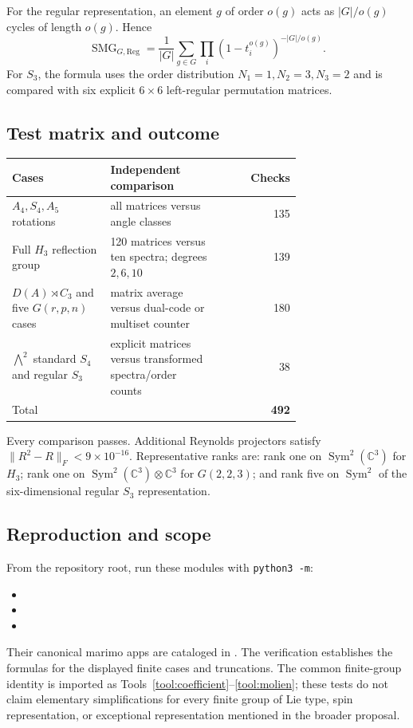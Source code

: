 \documentclass[10pt]{article}
\newcommand{\Sym}{\operatorname{Sym}}
\newcommand{\SMG}{\operatorname{SMG}}
\newcommand{\MGF}{\SMG}
\begin{document}
For the regular representation, an element $g$ of order $o(g)$ acts as
$|G|/o(g)$ cycles of length $o(g)$.  Hence
\[
 \boxed{\MGF_{G,\mathrm{Reg}}
 =\frac1{|G|}\sum_{g\in G}\prod_i
 (1-t_i^{o(g)})^{-|G|/o(g)}.}
\]
For $S_3$, the formula uses the order distribution
$N_1=1,N_2=3,N_3=2$ and is compared with six explicit $6\times6$ left-regular
permutation matrices.

\subsection{Test matrix and outcome}
\begin{center}
\begin{tabular}{@{}p{0.34\linewidth}p{0.38\linewidth}r@{}}
\toprule
Cases & Independent comparison & Checks\\
\midrule
$A_4,S_4,A_5$ rotations & all matrices versus angle classes & 135\\
Full $H_3$ reflection group & 120 matrices versus ten spectra; degrees $2,6,10$ & 139\\
$D(A)\rtimes C_3$ and five $G(r,p,n)$ cases & matrix average versus dual-code or multiset counter & 180\\
$\bigwedge^2$ standard $S_4$ and regular $S_3$ & explicit matrices versus transformed spectra/order counts & 38\\
\midrule
Total & & \textbf{492}\\
\bottomrule
\end{tabular}
\end{center}
Every comparison passes.  Additional Reynolds projectors satisfy
$\|R^2-R\|_F<9\times10^{-16}$.  Representative ranks are: rank one on
$\Sym^2(\mathbb C^3)$ for $H_3$; rank one on
$\Sym^2(\mathbb C^3)\otimes\mathbb C^3$ for $G(2,2,3)$; and rank five on
$\Sym^2$ of the six-dimensional regular $S_3$ representation.

\subsection{Reproduction and scope}
From the repository root, run these modules with \texttt{python3 -m}:
\begin{itemize}
\small
\item {}
\item {}
\item {}
\end{itemize}
Their canonical marimo apps are cataloged in
.  The verification establishes the formulas for the displayed finite cases and
truncations.  The common finite-group identity is imported as
Tools~\ref{tool:coefficient}--\ref{tool:molien}; these tests do not claim
elementary simplifications for every finite group of Lie type, spin
representation, or exceptional representation mentioned in the broader
proposal.
\endgroup
\end{document}
